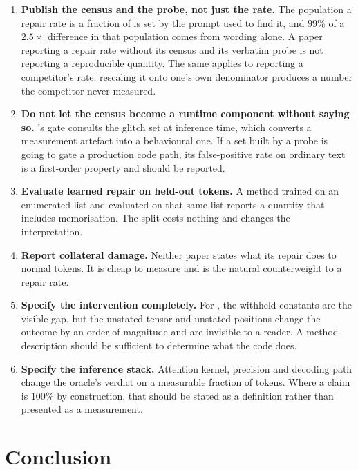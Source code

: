 \begin{enumerate}[leftmargin=*]
\item \textbf{Publish the census and the probe, not just the rate.} The population
a repair rate is a fraction of is set by the prompt used to find it, and $99\%$ of
a $2.5\times$ difference in that population comes from wording alone. A paper
reporting a repair rate without its census and its verbatim probe is not
reporting a reproducible quantity. The same applies to reporting a competitor's
rate: rescaling it onto one's own denominator produces a number the competitor
never measured.
\item \textbf{Do not let the census become a runtime component without saying
so.} \gc{}'s gate consults the glitch set at inference time, which converts a
measurement artefact into a behavioural one. If a set built by a probe is going
to gate a production code path, its false-positive rate on ordinary text is a
first-order property and should be reported.
\item \textbf{Evaluate learned repair on held-out tokens.} A method trained on an
enumerated list and evaluated on that same list reports a quantity that includes
memorisation. The split costs nothing and changes the interpretation.
\item \textbf{Report collateral damage.} Neither paper states what its repair does
to normal tokens. It is cheap to measure and is the natural counterweight to a
repair rate.
\item \textbf{Specify the intervention completely.} For \gp{}, the withheld
constants are the visible gap, but the unstated tensor and unstated positions
change the outcome by an order of magnitude and are invisible to a reader. A
method description should be sufficient to determine what the code does.
\item \textbf{Specify the inference stack.} Attention kernel, precision and
decoding path change the oracle's verdict on a measurable fraction of tokens.
Where a claim is $100\%$ by construction, that should be stated as a definition
rather than presented as a measurement.
\end{enumerate}

\section{Conclusion}

